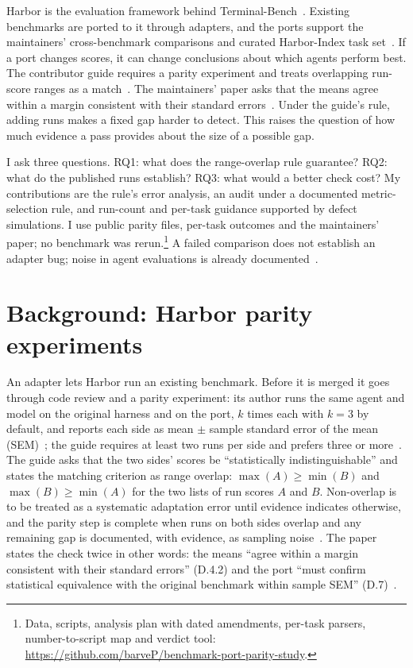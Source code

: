 \documentclass[conference]{IEEEtran}
\begin{document}
Harbor is the evaluation framework behind Terminal-Bench~\cite{terminal_bench}. Existing benchmarks are ported to it through adapters, and the ports support the maintainers' cross-benchmark comparisons and curated Harbor-Index task set~\cite{harbor_adapters}. If a port changes scores, it can change conclusions about which agents perform best. The contributor guide requires a parity experiment and treats overlapping run-score ranges as a match~\cite{harbor_contributing}. The maintainers' paper asks that the means agree within a margin consistent with their standard errors~\cite{harbor_adapters}. Under the guide's rule, adding runs makes a fixed gap harder to detect. This raises the question of how much evidence a pass provides about the size of a possible gap.

I ask three questions. RQ1: what does the range-overlap rule guarantee? RQ2: what do the published runs establish? RQ3: what would a better check cost? My contributions are the rule's error analysis, an audit under a documented metric-selection rule, and run-count and per-task guidance supported by defect simulations. I use public parity files, per-task outcomes and the maintainers' paper; no benchmark was rerun.\footnote{Data, scripts, analysis plan with dated amendments, per-task parsers, number-to-script map and verdict tool: \url{https://github.com/barveP/benchmark-port-parity-study}.} A failed comparison does not establish an adapter bug; noise in agent evaluations is already documented~\cite{miller_error_bars,hardy_reliability,segato_infra_noise}.

\section{Background: Harbor parity experiments}

An adapter lets Harbor run an existing benchmark. Before it is merged it goes through code review and a parity experiment: its author runs the same agent and model on the original harness and on the port, $k$ times each with $k=3$ by default, and reports each side as mean $\pm$ sample standard error of the mean (SEM)~\cite{harbor_adapters}; the guide requires at least two runs per side and prefers three or more~\cite{harbor_contributing}. The guide asks that the two sides' scores be ``statistically indistinguishable'' and states the matching criterion as range overlap: $\max(A) \ge \min(B)$ and $\max(B) \ge \min(A)$ for the two lists of run scores $A$ and $B$. Non-overlap is to be treated as a systematic adaptation error until evidence indicates otherwise, and the parity step is complete when runs on both sides overlap and any remaining gap is documented, with evidence, as sampling noise~\cite{harbor_contributing}. The paper states the check twice in other words: the means ``agree within a margin consistent with their standard errors'' (D.4.2) and the port ``must confirm statistical equivalence with the original benchmark within sample SEM'' (D.7)~\cite{harbor_adapters}.
\end{document}
